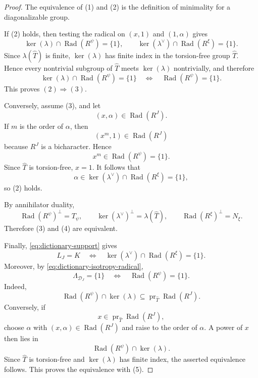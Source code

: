 \documentclass{amsart}
\theoremstyle{definition}
\newcommand{\Rad}{\operatorname{Rad}}
\numberwithin{equation}{section}
\begin{document}
\begin{proof}
The equivalence of (1) and (2) is the definition of minimality for a
diagonalizable group.  

If (2) holds, then testing the radical on $(x,1)$ and
$(1,\alpha)$ gives
\[
 \ker(\lambda)\cap\Rad(R^\psi)=\{1\},
 \qquad
 \ker(\lambda^\vee)\cap\Rad(R^\xi)=\{1\}.
\]
Since $\lambda(\widehat T)$ is finite, $\ker(\lambda)$ has finite index in the
torsion-free group $\widehat T$.  Hence every nontrivial subgroup of $\widehat T$ meets
$\ker(\lambda)$ nontrivially, and therefore
\[
 \ker(\lambda)\cap\Rad(R^\psi)=\{1\}
 \quad\Longleftrightarrow\quad
 \Rad(R^\psi)=\{1\}.
\]
This proves $(2)\Rightarrow(3)$.

Conversely, assume (3), and let
\[
 (x,\alpha)\in\Rad(R^J).
\]
If $m$ is the order of $\alpha$, then
\[
 (x^m,1)\in\Rad(R^J)
\]
because $R^J$ is a bicharacter.  Hence
\[
 x^m\in\Rad(R^\psi)=\{1\}.
\]
Since $\widehat T$ is torsion-free, $x=1$.  It follows that
\[
 \alpha\in
 \ker(\lambda^\vee)\cap\Rad(R^\xi)
 =\{1\},
\]
so (2) holds.

By annihilator duality,
\[
 \Rad(R^\psi)^\perp=T_\psi,
 \qquad
 \ker(\lambda^\vee)^\perp=\lambda(\widehat T),
 \qquad
 \Rad(R^\xi)^\perp=N_\xi.
\]
Therefore (3) and (4) are equivalent.  

Finally,
\eqref{eq:dictionary-support} gives
\[
 L_J=K
 \quad\Longleftrightarrow\quad
 \ker(\lambda^\vee)\cap\Rad(R^\xi)=\{1\}.
\]
Moreover, by \eqref{eq:dictionary-isotropy-radical},
\[
 \Lambda_{\mathcal D_J}=\{1\}
 \quad\Longleftrightarrow\quad
 \Rad(R^\psi)=\{1\}.
\]
Indeed,
\[
 \Rad(R^\psi)\cap\ker(\lambda)
 \subseteq
 \operatorname{pr}_{\widehat T}\Rad(R^J).
\]
Conversely, if
\[
 x\in\operatorname{pr}_{\widehat T}\Rad(R^J),
\]
choose $\alpha$ with $(x,\alpha)\in\Rad(R^J)$ and raise to the order of
$\alpha$.  A power of $x$ then lies in
\[
 \Rad(R^\psi)\cap\ker(\lambda).
\]
Since $\widehat T$ is torsion-free and $\ker(\lambda)$ has finite index, the asserted
equivalence follows.  This proves the equivalence with (5).
\end{proof}
\end{document}
